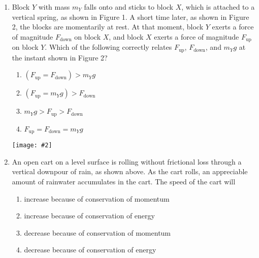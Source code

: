\documentclass[11pt]{article}
\newcommand{\pic}[2]{\texttt{[image: \#2]}}
\begin{document}
\begin{multicols}{2}
\begin{enumerate}[leftmargin=18pt]
    \begin{center}
      \pic{.25}{falling-blocks}
    \end{center}
  \item Block $Y$ with mass $m_Y$ falls onto and sticks to block $X$, which is
    attached to a vertical spring, as shown in Figure 1. A short time later, as
    shown in Figure 2, the blocks are momentarily at rest. At that moment,
    block $Y$ exerts a force of magnitude $F_\text{down}$ on block $X$, and
    block $X$ exerts a force of magnitude $F_\text{up}$ on block $Y$. Which of
    the following correctly relates $F_\text{up}$, $F_\text{down}$, and $m_Yg$ at
    the instant shown in Figure 2?
    \begin{enumerate}[nosep,leftmargin=18pt,label=(\Alph*)]
    \item$\left(F_\text{up}=F_\text{down}\right)>m_Yg$
    \item$\left(F_\text{up}=m_Yg\right)>F_\text{down}$
    \item$m_Yg > F_\text{up} > F_\text{down}$
    \item$F_\text{up}=F_\text{down}=m_Yg$
    \end{enumerate}
    \columnbreak
    
    \begin{center}
      \pic{.35}{downpour}
    \end{center}
  \item An open cart on a level surface is rolling without frictional loss
    through a vertical downpour of rain, as shown above. As the cart rolls,
    an appreciable amount of rainwater accumulates in the cart. The speed of
    the cart will
    \begin{enumerate}[nosep,leftmargin=18pt,label=(\Alph*)]
    \item increase because of conservation of momentum
    \item increase because of conservation of energy
    \item decrease because of conservation of momentum
    \item decrease because of conservation of energy
    \end{enumerate}
    \vspace{.7in}
    

\end{enumerate}
\end{multicols}
\end{document}
